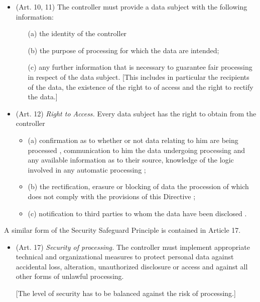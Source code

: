 \begin{itemize}
\item (Art. 10, 11) The controller \om must provide a data subject \om with the following information:
  \begin{itemize}
    \item [(a)] the identity of the controller \om
    \item [(b)] the purpose of processing for which the data are intended;
    \item [(c)] any further information \om that is necessary to guarantee fair processing in respect of the data subject. [This includes in particular the recipients of the data, the existence of the right to of access and the right to rectify the data.]
  \end{itemize}

\item (Art. 12) \emph{Right to Access.} Every data subject has the right to obtain from the controller
\begin{itemize}
  \item (a) \om confirmation as to whether or not data relating to him are being processed \om, communication to him \om the data undergoing processing and any available information as to their source, knowledge of the logic involved in any automatic processing \om;
  \item (b) the rectification, erasure or blocking of data the procession of which does not comply with the provisions of this Directive \om;
  \item (c) notification to third parties to whom the data have been disclosed \om.
\end{itemize}

\end{itemize}

A similar form of the Security Safeguard Principle is contained in Article 17.

\begin{itemize}
\item (Art. 17) \emph{Security of processing.}
The controller must implement appropriate technical and organizational measures to protect personal data against accidental loss, alteration, unauthorized disclosure or access \om and against all other forms of unlawful processing.

[The level of security has to be balanced against the risk of processing.]

\end{itemize}

